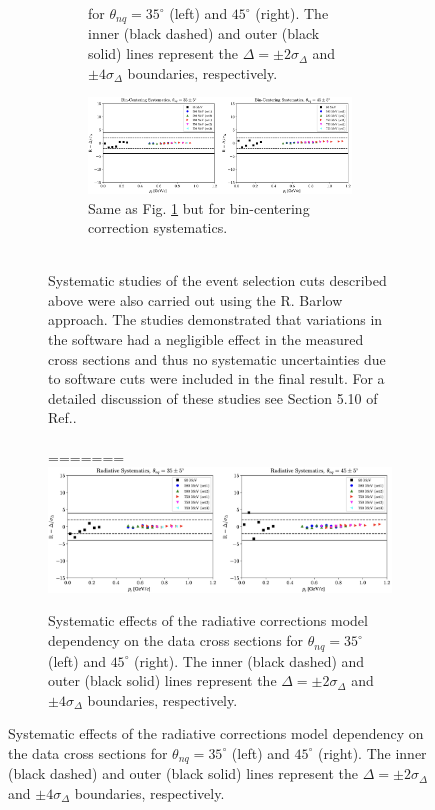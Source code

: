 \documentclass[aps, prl]{revtex4-2}  %
\providecommand{\DIFaddbeginFL}{} %
\providecommand{\DIFaddendFL}{} %
\providecommand{\DIFdelbeginFL}{} %
\providecommand{\DIFdelendFL}{} %
\newcommand{\DIFscaledelfig}{0.5}
\newlength{\DIFdelgraphicswidth} %
\newlength{\DIFdelgraphicsheight} %
\newcommand{\DIFaddincludegraphics}[2][]{{\color{blue}\fbox{\DIFOincludegraphics[#1]{#2}}}} %
\newcommand{\DIFdelincludegraphics}[2][]{%
\sbox{\DIFdelgraphicsbox}{\DIFOincludegraphics[#1]{#2}}%
\settoboxwidth{\DIFdelgraphicswidth}{\DIFdelgraphicsbox} %
\settoboxtotalheight{\DIFdelgraphicsheight}{\DIFdelgraphicsbox} %
\scalebox{\DIFscaledelfig}{%
\parbox[b]{\DIFdelgraphicswidth}{\usebox{\DIFdelgraphicsbox}\\[-\baselineskip] \rule{\DIFdelgraphicswidth}{0em}}\llap{\resizebox{\DIFdelgraphicswidth}{\DIFdelgraphicsheight}{%
\setlength{\unitlength}{\DIFdelgraphicswidth}%
\begin{picture}(1,1)%
\thicklines\linethickness{2pt} %
{\color[rgb]{1,0,0}\put(0,0){\framebox(1,1){}}}%
{\color[rgb]{1,0,0}\put(0,0){\line( 1,1){1}}}%
{\color[rgb]{1,0,0}\put(0,1){\line(1,-1){1}}}%
\end{picture}%
}\hspace*{3pt}}} %
} %
\DeclareRobustCommand{\DIFaddbeginFL}{\DIFOaddbeginFL \let\includegraphics\DIFaddincludegraphics} %
\DeclareRobustCommand{\DIFaddendFL}{\DIFOaddendFL \let\includegraphics\DIFOincludegraphics} %
\DeclareRobustCommand{\DIFdelbeginFL}{\DIFOdelbeginFL \let\includegraphics\DIFdelincludegraphics} %
\DeclareRobustCommand{\DIFdelendFL}{\DIFOaddendFL \let\includegraphics\DIFOincludegraphics} %
\begin{document}
\begin{figure}[!h]
\begin{figure}[!h]
\begin{figure}[!h]
{  for $\theta_{nq}=35^{\circ}$ (left) and $45^{\circ}$ (right). The inner (black dashed) and outer (black solid)
  lines represent the $\Delta=\pm2\sigma_{\Delta}$ and $\pm4\sigma_{\Delta}$ boundaries, respectively.  }
\label{fig:rad_sys}
\end{figure}
\begin{figure}[!ht]
\includegraphics[scale=0.37]{plots/bc_sys.png}
\caption{Same as Fig. \ref{fig:rad_sys} but for bin-centering correction systematics.}
\label{fig:bc_sys}
\end{figure}\\
\indent Systematic studies of the event selection cuts described above were also carried out using the R. Barlow approach. The studies demonstrated that variations in the software had a negligible
effect in the measured cross sections and thus no systematic uncertainties due to software cuts were included in the final result. For a detailed discussion of these studies see Section 5.10 of Ref.\cite{cyero_phdthesis}.
\\\\

=======
\DIFdelbeginFL %
\DIFdelendFL \DIFaddbeginFL \includegraphics[scale=0.37]{plots/rad_sys.png}
\DIFaddendFL \caption{Systematic effects of the radiative corrections model dependency on the data cross sections
  for $\theta_{nq}=35^{\circ}$ (left) and $45^{\circ}$ (right). The inner (black dashed) and outer (black solid)
  lines represent the $\Delta=\pm2\sigma_{\Delta}$ and $\pm4\sigma_{\Delta}$ boundaries, respectively.  }

\end{figure}
\end{figure}
\end{document}
